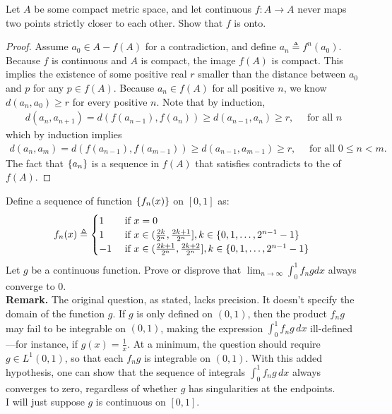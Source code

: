 \documentclass{report}
\begin{document}
\begin{question}{}{}
Let  $A$ be some compact metric space, and let continuous $f:A\rightarrow A$ never maps two points strictly closer to each other. Show that $f$ is onto.    
\end{question}
\begin{proof}
Assume $a_0 \in A - f(A)$ for a contradiction, and define    $a_n\triangleq f^n(a_0)$. Because $f$ is continuous and $A$ is compact, the image $f(A)$ is compact. This implies the existence of some positive real $r$ smaller than the distance between $a_0$ and  $p$ for any  $p \in f(A)$. Because $a_n \in f(A)$ for all positive $n$, we know $d(a_n,a_0)\geq r$ for every positive $n$. Note that by induction, 
\begin{align*}
d(a_n,a_{n+1})=d(f(a_{n-1}),f(a_n))\geq d(a_{n-1},a_n)\geq r, \quad \text{ for all }n
\end{align*}
which by induction implies 
\begin{align}
\label{dan}
d(a_n,a_m)=d(f(a_{n-1}),f(a_{m-1}))\geq d(a_{n-1},a_{m-1})\geq r,\quad \text{ for all }0\leq n <m. 
\end{align}
The fact that $\{ a_n \}$ is a sequence in $f(A)$ that satisfies  contradicts to the  of $f(A)$.  
\end{proof}
\begin{question}{}{}
Define a sequence of function $\{ f_n(x) \}$ on $[0,1]$ as: 
\begin{align*}
f_n(x)\triangleq \begin{cases}
  1& \text{ if $x=0$ }\\
  1& \text{ if $x\in (\frac{2k}{2^n}, \frac{2k+1}{2^n}],k \in \{ 0,1,\dots ,2^{n-1}-1 \}$ }\\
  -1& \text{ if $x\in (\frac{2k+1}{2^n},\frac{2k+2}{2^n}],k \in \{ 0,1,\dots ,2^{n-1}-1 \}$ }
\end{cases}
\end{align*}
Let  $g$ be a continuous function. Prove or disprove that $\lim_{n\to \infty} \int_{0}^1 f_ngdx$ always converge to $0$.  \\


\textbf{Remark.} The original question, as stated, lacks precision. It doesn't specify the domain of the function \( g \). If \( g \) is only defined on \( (0,1) \), then the product \( f_n g \) may fail to be integrable on $(0,1)$, making the expression \( \int_0^1 f_n g \, dx \) ill-defined—for instance, if \( g(x) = \frac{1}{x} \). At a minimum, the question should require \( g \in L^1(0,1) \), so that each \( f_n g \) is integrable on \( (0,1) \). With this added hypothesis, one can show that the sequence of integrals \( \int_0^1 f_n g \, dx \) always converges to zero, regardless of whether \( g \) has singularities at the endpoints. \\

I will just suppose $g$ is continuous on  $[0,1]$. 
\end{question}
\end{document}
